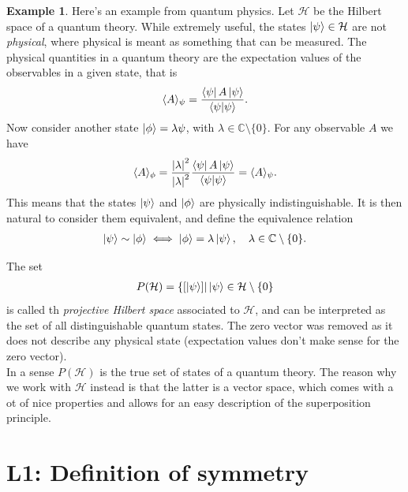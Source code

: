 \documentclass{book}
\theoremstyle{definition}
\newtheorem{exmp}{Example}[section]
\newcommand{\had}{\mathcal{H}}
\newcommand{\f}[2]{\frac{#1}{#2}}
\begin{document}
\begin{exmp}
	Here’s an example from quantum physics. Let $\had$ be the Hilbert space of a quantum theory. While extremely useful, the states $\ket{\psi} \in \had$ are not \textit{physical}, where physical is meant as something that can be measured. The physical quantities in a quantum theory are the expectation values of the observables in a given state, that is 
	\begin{align}
	\langle A \rangle_\psi = \f{\bra{\psi}A\ket{\psi}}{\braket{\psi}}.
	\end{align}
	Now consider another state $\ket{\phi} = \lambda{\psi}$, with $\lambda \in \mathbb{C}\setminus \{0\}$. For any observable $A$ we have
	\begin{align}
	\langle A \rangle_\phi = \f{\abs{\lambda}^2}{\abs{\lambda}^2}\f{\bra{\psi}A\ket{\psi}}{\braket{\psi}} = \langle A \rangle_\psi.
	\end{align}
	This means that the states $\ket{\psi}$ and $\ket{\phi}$ are physically indistinguishable. It is then natural to consider them equivalent, and define the equivalence relation 
	\begin{align}
	\ket{\psi} \sim \ket{\phi} \iff \ket{\phi} = \lambda\ket{\psi}, \quad \lambda \in \mathbb{C}\setminus \{0\}.
	\end{align}
	
	The set 
	\begin{align}
	P(\had) = \{ [\ket{\psi}] \vert \ket{\psi} \in \had\setminus\{0   \}
	\end{align}
	is called th \textit{projective Hilbert space} associated to $\had$, and can be interpreted as the set of all distinguishable quantum states. The zero vector was removed as it does not describe any physical state (expectation values don't make sense for the zero vector). \\
	
	In a sense $P(\had)$ is the true set of states of a quantum theory. The reason why we work with $\had$ instead is that the latter is a vector space, which comes with a ot of nice properties and allows for an easy description of the superposition principle. 
	
	
	
\end{exmp}




\newpage



\section{L1: Definition of symmetry}
\end{document}
